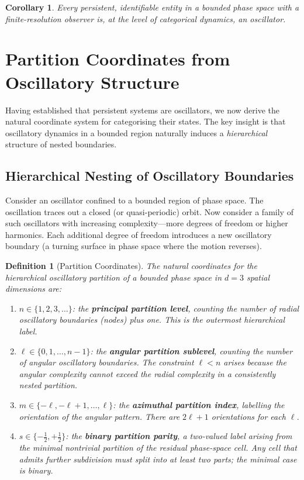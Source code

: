 \documentclass[11pt,twocolumn,a4paper]{article}
\newtheorem{corollary}[theorem]{Corollary}
\newtheorem{definition}[theorem]{Definition}
\begin{document}
\begin{corollary}\label{cor:oscillation_universal}
Every persistent, identifiable entity in a bounded phase space with a finite-resolution observer is, at the level of categorical dynamics, an oscillator.
\end{corollary}

\section{Partition Coordinates from Oscillatory Structure}\label{sec:partition_coordinates}

Having established that persistent systems are oscillators, we now derive the natural coordinate system for categorising their states. The key insight is that oscillatory dynamics in a bounded region naturally induces a \emph{hierarchical} structure of nested boundaries.

\subsection{Hierarchical Nesting of Oscillatory Boundaries}

Consider an oscillator confined to a bounded region of phase space. The oscillation traces out a closed (or quasi-periodic) orbit. Now consider a family of such oscillators with increasing complexity---more degrees of freedom or higher harmonics. Each additional degree of freedom introduces a new oscillatory boundary (a turning surface in phase space where the motion reverses).

\begin{definition}[Partition Coordinates]\label{def:partition_coords}
The natural coordinates for the hierarchical oscillatory partition of a bounded phase space in $d = 3$ spatial dimensions are:
\begin{enumerate}[label=(\alph*)]
    \item $n \in \{1, 2, 3, \ldots\}$: the \textbf{principal partition level}, counting the number of radial oscillatory boundaries (nodes) plus one. This is the outermost hierarchical label.
    \item $\ell \in \{0, 1, \ldots, n-1\}$: the \textbf{angular partition sublevel}, counting the number of angular oscillatory boundaries. The constraint $\ell < n$ arises because the angular complexity cannot exceed the radial complexity in a consistently nested partition.
    \item $m \in \{-\ell, -\ell+1, \ldots, \ell\}$: the \textbf{azimuthal partition index}, labelling the orientation of the angular pattern. There are $2\ell + 1$ orientations for each $\ell$.
    \item $s \in \{-\tfrac{1}{2}, +\tfrac{1}{2}\}$: the \textbf{binary partition parity}, a two-valued label arising from the minimal nontrivial partition of the residual phase-space cell. Any cell that admits further subdivision must split into at least two parts; the minimal case is binary.
\end{enumerate}
\end{definition}
\end{document}
